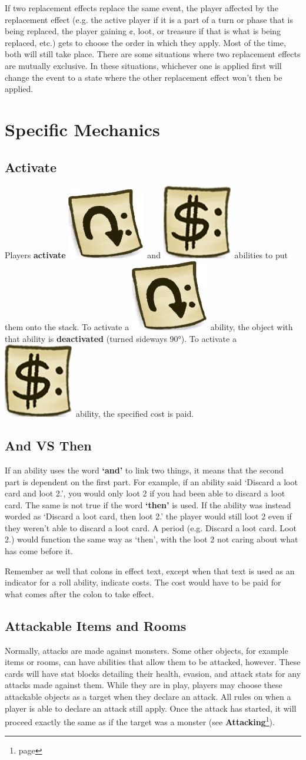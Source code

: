 \documentclass[a4paper, twoside]{report} %
\newcommand{\tap}{\includegraphics[scale=0.1]{./assets/Tag_Tap.png}}
\newcommand{\pay}{\includegraphics[scale=0.1]{./assets/Tag_Paid.png}}
\begin{document}
    If two replacement effects replace the same event, the player affected by the replacement effect (e.g. the active player if it is a part of a turn or phase that is being replaced, the player gaining ¢, loot, or treasure if that is what is being replaced, etc.) gets to choose the order in which they apply. Most of the time, both will still take place. There are some situations where two replacement effects are mutually exclusive. In these situations, whichever one is applied first will change the event to a state where the other replacement effect won’t then be applied.

    \chapter{Specific Mechanics}
    \label{mechanics}
    \section{Activate}
    Players \textbf{activate} \tap\ and \pay\ abilities to put them onto the stack. To activate a \tap\ ability, the object with that ability is \textbf{deactivated} (turned sideways 90°). To activate a \pay\ ability, the specified cost is paid.
    \section{And VS Then}
    If an ability uses the word \textbf{‘and’} to link two things, it means that the second part is dependent on the first part. For example, if an ability said ‘Discard a loot card and loot 2.’, you would only loot 2 if you had been able to discard a loot card. The same is not true if the word \textbf{‘then’} is used. If the ability was instead worded as ‘Discard a loot card, then loot 2.’ the player would still loot 2 even if they weren’t able to discard a loot card. A period (e.g. Discard a loot card. Loot 2.) would function the same way as ‘then’, with the loot 2 not caring about what has come before it.

    Remember as well that colons in effect text, except when that text is used as an indicator for a roll ability, indicate costs. The cost would have to be paid for what comes after the colon to take effect.
    \section{Attackable Items and Rooms}
    Normally, attacks are made against monsters. Some other objects, for example items or rooms, can have abilities that allow them to be attacked, however. These cards will have stat blocks detailing their health, evasion, and attack stats for any attacks made against them. While they are in play, players may choose these attackable objects as a target when they declare an attack. All rules on when a player is able to declare an attack still apply. Once the attack has started, it will proceed exactly the same as if the target was a monster (see \textbf{Attacking}\footnote{page \pageref{attacking}}).
\end{document}
